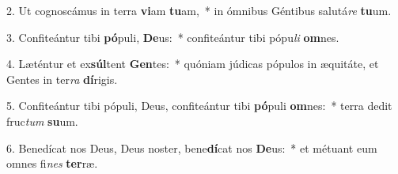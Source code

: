 2. Ut cognoscámus in terra \textbf{vi}am \textbf{tu}am,~*  in ómnibus Géntibus salutá\textit{re} \textbf{tu}um.\

3. Confiteántur tibi \textbf{pó}puli, \textbf{De}us:~*  confiteántur tibi pópu\textit{li} \textbf{om}nes.\

4. Læténtur et ex\textbf{súl}tent \textbf{Gen}tes:~*  quóniam júdicas pópulos in æquitáte, et Gentes in ter\textit{ra} \textbf{dí}rigis.\

5. Confiteántur tibi pópuli, Deus, confiteántur tibi \textbf{pó}puli \textbf{om}nes:~*  terra dedit fruc\textit{tum} \textbf{su}um.\

6. Benedícat nos Deus, Deus noster, bene\textbf{dí}cat nos \textbf{De}us:~*  et métuant eum omnes fi\textit{nes} \textbf{ter}ræ.\

